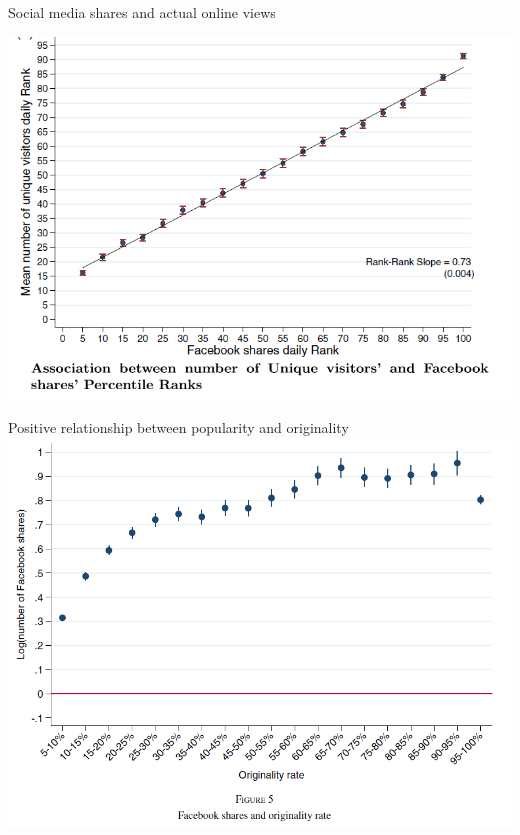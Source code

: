 \documentclass[english]{beamer}
\begin{document}
\begin{frame}{Social media shares and actual online views}
\begin{center}
 \includegraphics[width=1\textwidth]{Images/cage-6.PNG}
\end{center}
\end{frame}


\begin{frame}{Positive relationship between popularity and originality}
    \includegraphics[width=1\textwidth]{Images/cage-3.PNG}
\end{frame}
\end{document}
